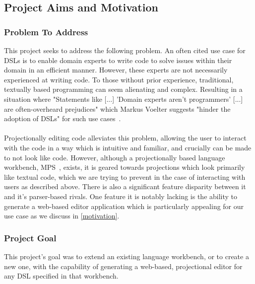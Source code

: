 \documentclass{article}
\begin{document}
\subsection{Project Aims and Motivation}

\subsubsection{Problem To Address}\label{problem}

This project seeks to address the following problem. An often cited use case for DSLs is to enable domain experts to write code to solve issues within their domain in an efficient manner. However, these experts are not necessarily experienced at writing code. To those without prior experience, traditional, textually based programming can seem alienating and complex. Resulting in a situation where "Statements like [...] 'Domain experts aren't programmers' [...] are often-overheard prejudices" which Markus Voelter suggests "hinder the adoption of DSLs" for such use cases~\cite[pg.45]{dslEngineering}.
\\
\\
Projectionally editing code alleviates this problem, allowing the user to interact with the code in a way which is intuitive and familiar, and crucially can be made to not look like code. However, although a projectionally based language workbench, MPS~\cite{mps}, exists, it is geared towards projections which look primarily like textual code, which we are trying to prevent in the case of interacting with users as described above. There is also a significant feature disparity between it and it's parser-based rivals. One feature it is notably lacking is the ability to generate a web-based editor application which is particularly appealing for our use case as we discuss in \ref{motivation}.

\subsubsection{Project Goal}\label{goal}
This project's goal was to extend an existing language workbench, or to create a new one, with the capability of generating a web-based, projectional editor for any DSL specified in that workbench. 
\end{document}
